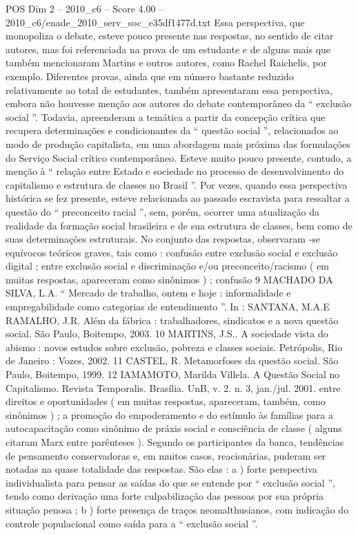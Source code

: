 \begin{textsample}{POS Dim 2 – 2010\_c6 – Score 4.00 – 2010\_c6/enade\_2010\_serv\_soc\_e35df1477d.txt}
Essa perspectiva, que monopoliza o debate, esteve pouco presente nas respostas, no sentido de citar autores, mas foi referenciada na prova de um estudante e de alguns mais que também mencionaram Martins e outros autores, como Rachel Raichelis, por exemplo.
Diferentes provas, ainda que em número bastante reduzido relativamente ao total de estudantes, também apresentaram essa perspectiva, embora não houvesse menção aos autores do debate contemporâneo da “ exclusão social ”.
Todavia, apreenderam a temática a partir da concepção crítica que recupera determinações e condicionantes da “ questão social ”, relacionados ao modo de produção capitalista, em uma abordagem mais próxima das formulações do Serviço Social crítico contemporâneo.
Esteve muito pouco presente, contudo, a menção à “ relação entre Estado e sociedade no processo de desenvolvimento do capitalismo e estrutura de classes no Brasil ”.
Por vezes, quando essa perspectiva histórica se fez presente, esteve relacionada ao passado escravista para ressaltar a questão do “ preconceito racial ”, sem, porém, ocorrer uma atualização da realidade da formação social brasileira e de sua estrutura de classes, bem como de suas determinações estruturais.
No conjunto das respostas, observaram -se equívocos teóricos graves, tais como : confusão entre exclusão social e exclusão digital ; entre exclusão social e discriminação e/ou preconceito/racismo ( em muitas respostas, apareceram como sinônimos ) ; confusão 9 MACHADO DA SILVA, L.A. “ Mercado de trabalho, ontem e hoje : informalidade e empregabilidade como categorias de entendimento ”.
In : SANTANA, M.A.E RAMALHO, J.R.
Além da fábrica : trabalhadores, sindicatos e a nova questão social.
São Paulo, Boitempo, 2003. 10 MARTINS, J.S..
A sociedade vista do abismo : novos estudos sobre exclusão, pobreza e classes sociais.
Petrópolis, Rio de Janeiro : Vozes, 2002. 11 CASTEL, R.
Metamorfoses da questão social.
São Paulo, Boitempo, 1999. 12 IAMAMOTO, Marilda Villela.
A Questão Social no Capitalismo.
Revista Temporalis.
Brasília.
UnB, v. 2. n. 3, jan./jul. 2001. entre direitos e oportunidades ( em muitas respostas, apareceram, também, como sinônimos ) ; a promoção do empoderamento e do estímulo às famílias para a autocapacitação como sinônimo de práxis social e consciência de classe ( alguns citaram Marx entre parênteses ).
Segundo os participantes da banca, tendências de pensamento conservadoras e, em muitos casos, reacionárias, puderam ser notadas na quase totalidade das respostas.
São elas : a ) forte perspectiva individualista para pensar as saídas do que se entende por “ exclusão social ”, tendo como derivação uma forte culpabilização das pessoas por sua própria situação penosa ; b ) forte presença de traços neomalthusianos, com indicação do controle populacional como saída para a “ exclusão social ”.

\end{textsample}
